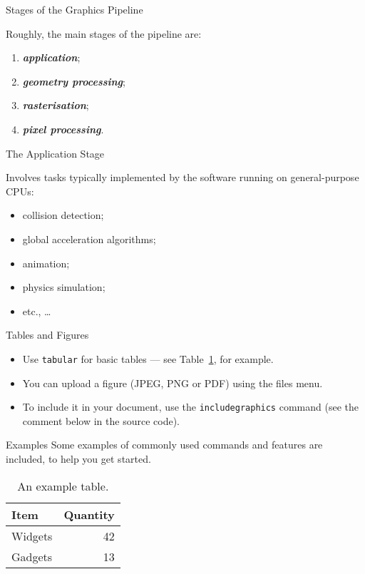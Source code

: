 \documentclass{beamer}
\newcommand{\emphbf}[1]{\textbf{\emph{#1}}}
\begin{document}
\begin{frame}{Stages of the Graphics Pipeline}

	Roughly, the main stages of the pipeline are:

	\begin{enumerate}
		\item \emphbf{application};
		\item \emphbf{geometry processing};
		\item \emphbf{rasterisation};
		\item \emphbf{pixel processing}.
	\end{enumerate}

\end{frame}

\begin{frame}{The Application Stage}

	Involves tasks typically implemented by the software running on general-purpose CPUs:

	\begin{itemize}
		\item collision detection;
		\item global acceleration algorithms;
		\item animation;
		\item physics simulation;
		\item etc., \ldots
	\end{itemize}

\end{frame}



\begin{frame}{Tables and Figures}

\begin{itemize}
\item Use \texttt{tabular} for basic tables --- see Table~\ref{tab:widgets}, for example.
\item You can upload a figure (JPEG, PNG or PDF) using the files menu.
\item To include it in your document, use the \texttt{includegraphics} command (see the comment below in the source code).
\end{itemize}

\begin{block}{Examples}
	Some examples of commonly used commands and features are included, to help you get started.
\end{block}


\begin{table}
\centering
\begin{tabular}{l|r}
Item & Quantity \\\hline
Widgets & 42 \\
Gadgets & 13
\end{tabular}
\caption{\label{tab:widgets}An example table.}
\end{table}

\end{frame}
\end{document}
